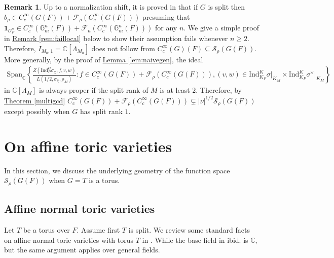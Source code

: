 \documentclass[10pt]{amsart}
\theoremstyle{definition}
\newtheorem{remark}[theorem]{Remark}
\numberwithin{equation}{section}
\numberwithin{equation}{subsection}
\newcommand{\Ind}{\mathrm{Ind}}
\newcommand{\CC}{\mathbb{C}}
\newcommand{\GG}{\mathbb{G}}
\begin{document}
\begin{remark}\label{remark:small}
    Up to a normalization shift, it is proved in \cite{shahidi2022resolution} that if $G$ is split then $b_\rho\in C^\infty_c(G(F))+\mathcal{F}_\rho(C^\infty_c(G(F)))$ presuming that $\mathbf{1}_{\mathcal{O}_F^n}\in C^\infty_c(\GG_m^n(F))+\mathcal{F}_n(C^\infty_c(\GG_m^n(F)))$ for any $n$. We give a simple proof in \hyperref[rem:faillocal]{Remark \ref{rem:faillocal}} below to show their assumption fails whenever $n\ge 2$. Therefore, $I_{M_0,1}=\CC[\Lambda_{M_0}]$ does not follow from $C^\infty_c(G)(F)\subseteq \mathcal{S}_\rho(G(F))$. More generally, by the proof of \hyperref[lem:naivegen]{Lemma \ref{lem:naivegen}}, the ideal
    \begin{align*}
        \mathrm{Span}_\CC\left\{\frac{Z(\mathrm{Ind}_P^G \sigma_\chi,f,v,w)}{L(1/2,\sigma_\chi,\rho_M)}: f\in C^\infty_c(G(F))+\mathcal{F}_\rho(C^\infty_c(G(F))),(v,w)\in \Ind_{K_P}^K\sigma\vert_{K_M}\times \Ind_{K_P}^K\sigma^\vee\vert_{K_M}\right\}
    \end{align*}
    in $\CC[\Lambda_M]$ is always proper if the split rank of $M$ is at least $2$. Therefore, by \hyperref[multigcd]{Theorem \ref{multigcd}} $C^\infty_c(G(F))+\mathcal{F}_\rho(C^\infty_c(G(F)))\subsetneq |\nu|^{1/2}\mathcal{S}_\rho(G(F))$ except possibly when $G$ has split rank $1$.
\end{remark}




\section{On affine toric varieties}\label{sec:toric:Schwartz}

In this section, we discuss the underlying geometry of the function space $\mathcal{S}_\rho(G(F))$ when $G=T$ is a torus. 


\subsection{Affine normal toric varieties}\label{subsec:affinetoric}
Let $T$ be a torus over $F$. Assume first $T$ is split. We review some standard facts on affine normal toric varieties with torus $T$ in \cite{Fulton:toric}. While the base field in ibid. is $\CC$, but the same argument applies over general fields.
\end{document}
